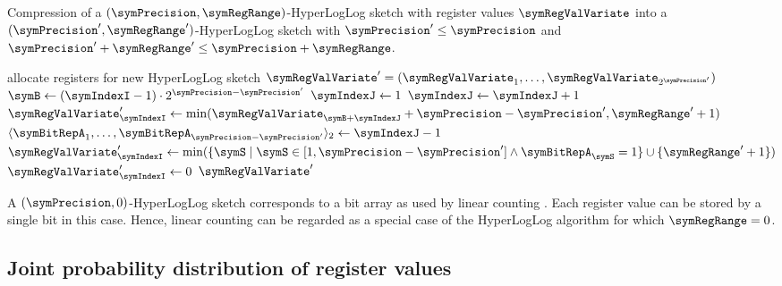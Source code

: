 \documentclass[a4paper]{scrartcl}
\begin{document}
\begin{algorithm}
\caption{Compression of a $(\symPrecision, \symRegRange)$-HyperLogLog sketch with register values $\boldsymbol{\symRegValVariate}$ into a $(\symPrecision', \symRegRange')$-HyperLogLog sketch with $\symPrecision'\leq\symPrecision$ and $\symPrecision'+\symRegRange' \leq\symPrecision + \symRegRange$.}
\label{alg:compress}
\begin{algorithmic}
\State allocate registers for new HyperLogLog sketch $\boldsymbol{\symRegValVariate}' = (\symRegValVariate_1,\ldots,\symRegValVariate_{2^{\symPrecision'}})$
\State $\symB \gets (\symIndexI-1)\cdot 2^{\symPrecision-\symPrecision'}$
\State $\symIndexJ\gets 1$
\State $\symIndexJ\gets\symIndexJ+1$
\EndWhile
{}
\State $\symRegValVariate'_\symIndexI \gets \min(\symRegValVariate_{\symB+\symIndexJ} + \symPrecision-\symPrecision',\symRegRange'+1)$
\State $\langle \symBitRepA_1, \ldots, \symBitRepA_{\symPrecision-\symPrecision'}\rangle_2 \gets \symIndexJ-1$
\State $\symRegValVariate'_\symIndexI \gets 
\min(\{\symS\mid \symS \in [1, \symPrecision-\symPrecision']  \wedge  \symBitRepA_\symS = 1\} \cup \{\symRegRange'+1\})$
\Else
\State $\symRegValVariate'_\symIndexI \gets 0$
\EndIf
\EndFor
\State \Return $\boldsymbol{\symRegValVariate}'$
\EndFunction
\end{algorithmic}
\end{algorithm}

A $(\symPrecision, 0)$-HyperLogLog sketch corresponds to a bit array as used by linear counting \cite{Whang1990}. Each register value can be stored by a single bit in this case. Hence, linear counting can be regarded as a special case of the HyperLogLog algorithm for which $\symRegRange = 0$.

\subsection{Joint probability distribution of register values}
\end{document}
